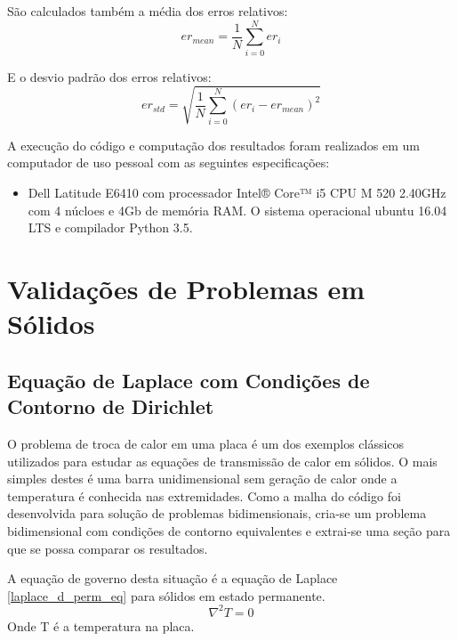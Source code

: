 São calculados também a média dos erros relativos:
\begin{equation}
    er_{mean} = \frac{1}{N}\sum_{i=0}^{N} er_i
    \label{error_mean}
\end{equation}

E o desvio padrão dos erros relativos:
\begin{equation}
    er_{std} = \sqrt{\frac{1}{N}\sum_{i=0}^{N} (er_i-er_{mean})^2}
    \label{error_std} 
\end{equation}

A execução do código e computação dos resultados foram realizados em um computador de uso pessoal com as seguintes especificações:
\begin{itemize}
    \item Dell Latitude E6410 com processador Intel® Core™ i5 CPU M 520 2.40GHz com 4 núcloes e 4Gb de memória RAM.
          O sistema operacional ubuntu 16.04 LTS e compilador Python 3.5.
\end{itemize}

\section{\textbf{Validações de Problemas em Sólidos}}
\subsection{\textbf{Equação de Laplace com Condições de Contorno de Dirichlet}}
\label{sec_laplace_dir}
O problema de troca de calor em uma placa é um dos exemplos clássicos utilizados para estudar as equações de transmissão de calor em sólidos. O mais simples destes é uma barra unidimensional sem geração de calor onde a temperatura é conhecida nas extremidades.
Como a malha do código foi desenvolvida para solução de problemas bidimensionais, cria-se um problema bidimensional com condições de contorno equivalentes e extrai-se uma seção para que se possa comparar os resultados.

A equação de governo desta situação é a equação de Laplace \ref{laplace_d_perm_eq} para sólidos em estado permanente.
\begin{equation}
    \nabla^2 T = 0
    \label{laplace_d_perm_eq} 
\end{equation}
Onde T é a temperatura na placa.


